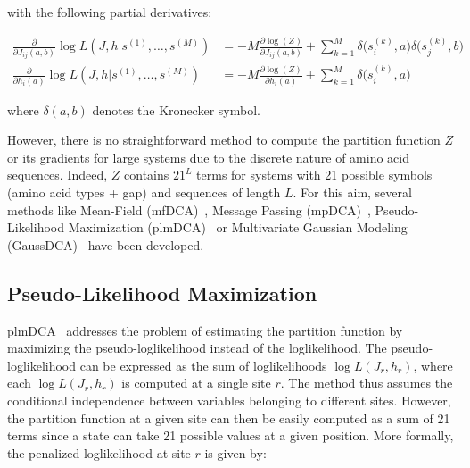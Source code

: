         with the following partial derivatives:

        \begin{equation}
            \begin{split}
                \frac{\partial}{\partial J_{ij}(a, b)} \log{L}(J, h \vert s^{(1)}, \dotsc, s^{(M)}) & = 
                    -M \frac{\partial \log(Z)}{\partial J_{ij}(a, b)} + \sum\limits_{k=1}^M \delta\Big(s_i^{(k)}, a\Big) \delta\Big(s_j^{(k)}, b\Big) \\
                 \frac{\partial}{\partial h_{i}(a)} \log{L}(J, h \vert s^{(1)}, \dotsc, s^{(M)}) & = 
                    -M \frac{\partial \log(Z)}{\partial h_{i}(a)} + \sum\limits_{k=1}^M \delta\Big(s_i^{(k)}, a\Big)
            \end{split}
        \end{equation}

        where $\delta(a, b)$ denotes the Kronecker symbol.

        However, there is no straightforward method to compute the partition function $Z$ or its gradients for large
        systems due to the discrete nature of amino acid sequences. Indeed, $Z$ contains $21^L$ terms for systems with 21 possible symbols (amino acid types + gap)
        and sequences of length $L$. For this aim, several methods like Mean-Field (mfDCA)~\cite{MorcosE1293}, Message Passing (mpDCA)~\cite{Weigt2009},
        Pseudo-Likelihood Maximization (plmDCA)~\cite{EKEBERG2014341} or Multivariate Gaussian Modeling (GaussDCA)~\cite{10.1371/journal.pone.0092721}
        have been developed.

    \subsection{Pseudo-Likelihood Maximization}

        plmDCA~\cite{EKEBERG2014341} addresses the problem of estimating the partition function by maximizing the pseudo-loglikelihood instead of the loglikelihood.
        The pseudo-loglikelihood can be expressed as the sum of loglikelihoods $\log{L}(J_r, h_r)$, where each $\log{L}(J_r, h_r)$ is computed
        at a single site $r$. The method thus assumes the conditional independence between variables belonging to different sites.
        However, the partition function at a given site can then be easily computed as a sum of 21 terms since a state can take 21 possible values at a given position.
        More formally, the penalized loglikelihood at site $r$ is given by:

